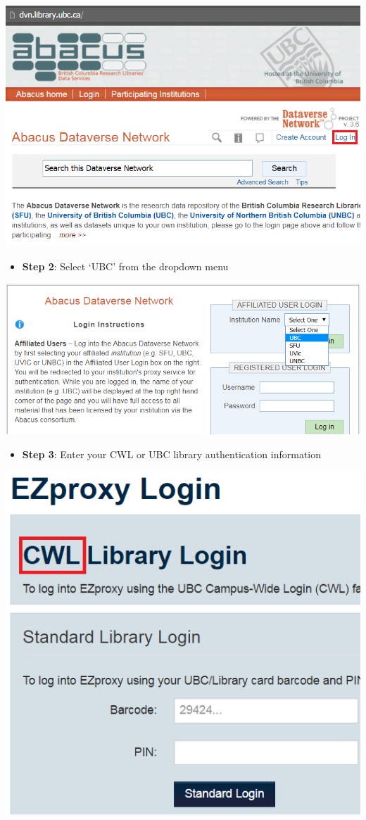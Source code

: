 \documentclass[
]{book}
\providecommand{\tightlist}{%
  \setlength{\itemsep}{0pt}\setlength{\parskip}{0pt}}
\begin{document}
\includegraphics[width=0.65\linewidth]{images/abacus1}

\begin{itemize}
\tightlist
\item
  \textbf{Step 2}: Select `UBC' from the dropdown menu
\end{itemize}

\includegraphics[width=0.65\linewidth]{images/abacus2}

\begin{itemize}
\tightlist
\item
  \textbf{Step 3}: Enter your CWL or UBC library authentication information
\end{itemize}

\includegraphics[width=0.65\linewidth]{images/abacus3}
\end{document}

